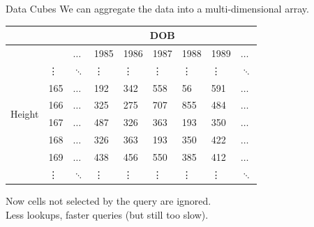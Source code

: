 \documentclass{beamer}
\theoremstyle{definition}
\theoremstyle{definition}
\begin{document}
\begin{frame}{Data Cubes}
    We can aggregate the data into a multi-dimensional array.\cite{Gray96}

    \begin{table}[h]\footnotesize
        \begin{tabular} { | l | l | l | l | l | l | l | l | l |}
        \hline
        & & \multicolumn{7}{|c|}{DOB} \\ \hline
        & & $\hdots$ & 1985 & 1986 & 1987 & 1988 & 1989 & $\hdots$ \\ \hline
        \multirow{6}{*}{Height}
        & \vdots & $\ddots$ & \vdots & \vdots & \vdots & \vdots & \vdots & $\ddots$ \\
        & 165 & $\hdots$ & 192 & 342 & 558 & 56 & 591 & $\hdots$ \\
        & 166 & $\hdots$ & 325 & 275 & 707 & 855 & 484 & $\hdots$ \\
        & 167 & $\hdots$ & 487 & 326 & 363 & 193 & 350 & $\hdots$ \\
        & 168 & $\hdots$ & 326 & 363 & 193 & 350 & 422 & $\hdots$ \\
        & 169 & $\hdots$ & 438 & 456 & 550 & 385 & 412 & $\hdots$ \\
        & \vdots & $\ddots$ & \vdots & \vdots & \vdots & \vdots & \vdots & $\ddots$ \\
        \hline
        \end{tabular}
    \end{table}
    \pause
    Now cells not selected by the query are ignored. \\
    Less lookups, faster queries (but still too slow).
\end{frame}
\end{document}
